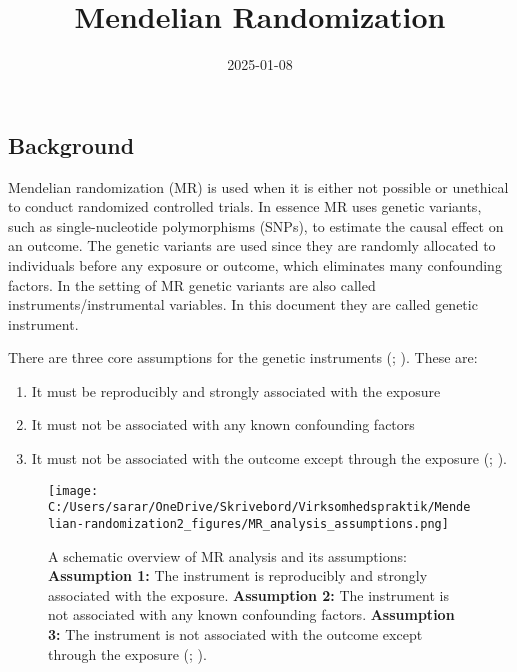 \documentclass[
]{article}
\title{Mendelian Randomization}
\author{}
\date{\vspace{-2.5em}2025-01-08}
\providecommand{\tightlist}{%
  \setlength{\itemsep}{0pt}\setlength{\parskip}{0pt}}
\begin{document}
\maketitle

\subsection{Background}\label{background}

Mendelian randomization (MR) is used when it is either not possible or
unethical to conduct randomized controlled trials. In essence MR uses
genetic variants, such as single-nucleotide polymorphisms (SNPs), to
estimate the causal effect on an outcome. The genetic variants are used
since they are randomly allocated to individuals before any exposure or
outcome, which eliminates many confounding factors. In the setting of MR
genetic variants are also called instruments/instrumental variables. In
this document they are called genetic instrument.

There are three core assumptions for the genetic instruments
(;
). These are:

\begin{enumerate}
\def\labelenumi{\arabic{enumi}.}
\tightlist
\item
  It must be reproducibly and strongly associated with the exposure
\item
  It must not be associated with any known confounding factors
\item
  It must not be associated with the outcome except through the exposure
  (;
  ).
\end{enumerate}

\begin{figure}
\centering
\texttt{[image: C:/Users/sarar/OneDrive/Skrivebord/Virksomhedspraktik/Mendelian-randomization2\_figures/MR\_analysis\_assumptions.png]}
\caption{A schematic overview of MR analysis and its assumptions:
\textbf{Assumption 1:} The instrument is reproducibly and strongly
associated with the exposure. \textbf{Assumption 2:} The instrument is
not associated with any known confounding factors. \textbf{Assumption
3:} The instrument is not associated with the outcome except through the
exposure (;
). \label{assumptions}}
\end{figure}
\end{document}
